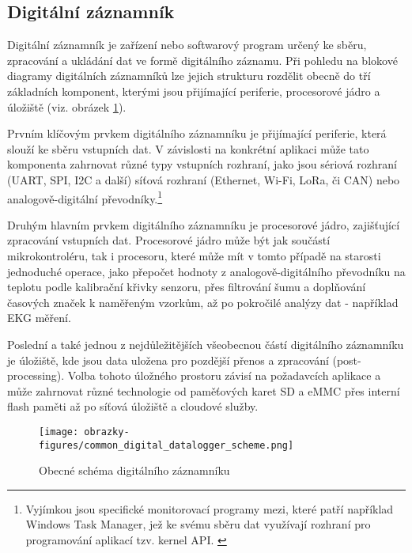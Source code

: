 \subsection{Digitální záznamník}
Digitální záznamník je zařízení nebo softwarový program určený ke sběru, zpracování a ukládání dat ve formě digitálního záznamu. Při pohledu na blokové diagramy digitálních záznamníků lze jejich strukturu rozdělit obecně do tří základních komponent, kterými jsou přijímající periferie, procesorové jádro a úložiště (viz. obrázek \ref{fig:common-digital-datalogger}). \cite{ieee_digital_sound_recorder_arm_sd_card, ieee_multi_connectivity_datalogger_sd_card, researchgate_general_dataloggger_multiple_sdcards}

Prvním klíčovým prvkem digitálního záznamníku je přijímající periferie, která slouží ke sběru vstupních dat. V závislosti na konkrétní aplikaci může tato komponenta zahrnovat různé typy vstupních rozhraní, jako jsou sériová rozhraní (UART, SPI, I2C a další) síťová rozhraní (Ethernet, Wi-Fi, LoRa, či CAN) nebo analogově-digitální převodníky.\footnote{Vyjímkou jsou specifické monitorovací programy mezi, které patří například Windows Task Manager, jež ke svému sběru dat využívají rozhraní pro programování aplikací tzv. kernel API. \cite{fourcore_win_process_birth}} \cite{ieee_digital_sound_recorder_arm_sd_card}

\newpage

Druhým hlavním prvkem digitálního záznamníku je procesorové jádro, zajišťující zpracování vstupních dat. Procesorové jádro může být jak součástí mikrokontroléru, tak i procesoru, které může mít v tomto případě na starosti jednoduché operace, jako přepočet hodnoty z analogově-digitálního převodníku na teplotu podle kalibrační křivky senzoru, přes filtrování šumu a doplňování časových značek k naměřeným vzorkům, až po pokročilé analýzy dat - například EKG měření. \cite{springer_development_ECG_recorder}

Poslední a také jednou z nejdůležitějších všeobecnou částí digitálního záznamníku je úložiště, kde jsou data uložena pro pozdější přenos a zpracování (post-processing). Volba tohoto úložného prostoru závisí na požadavcích aplikace a může zahrnovat různé technologie od paměťových karet SD a eMMC přes interní flash paměti až po síťová úložiště a cloudové služby.

\begin{figure}[h] %
    \centering
    \texttt{[image: obrazky-figures/common\_digital\_datalogger\_scheme.png]}
    \caption{Obecné schéma digitálního záznamníku}
    \label{fig:common-digital-datalogger}
\end{figure}


